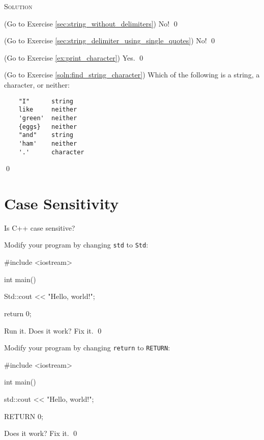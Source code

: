 \newpage
\textsc{Solution}

\begin{soln} \label{sec:string_without_delimiters_soln}
(Go to Exercise \ref{sec:string_without_delimiters})
No!
\qed
\end{soln}

\begin{soln} \label{sec:string_delimiter_using_single_quotes_soln}
(Go to Exercise \ref{sec:string_delimiter_using_single_quotes})
No!
\qed
\end{soln}

\begin{soln} \label{soln:print_character}
(Go to Exercise \ref{ex:print_character})
Yes.
\qed
\end{soln}

\begin{soln} \label{ex:find_string_character}
(Go to Exercise \ref{soln:find_string_character})
Which of the following is a string, a character, or neither:
\begin{verbatim}
    "I"      string
    like     neither
    'green'  neither
    {eggs}   neither
    "and"    string
    'ham'    neither
    '.'      character
\end{verbatim}
\qed
\end{soln}



\newpage\section{Case Sensitivity}

Is C++ case sensitive?

\begin{ex}
Modify your program by changing \verb!std! to \verb!Std!:
\begin{console}
#include <iostream>

int main()
{
    Std::cout << "Hello, world!\n";

    return 0;
}
\end{console}
Run it. Does it work? Fix it.
\qed
\end{ex}

\begin{ex}
Modify your program by changing \verb!return! to \verb!RETURN!:
\begin{console}
#include <iostream>

int main()
{
    std::cout << "Hello, world!\n";

    RETURN 0;
}
\end{console}
Does it work? Fix it.
\qed
\end{ex}


